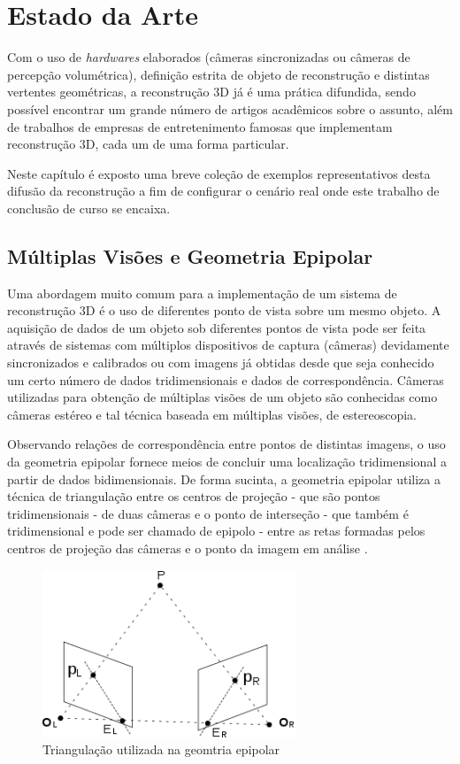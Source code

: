 \chapter{Estado da Arte}

Com o uso de \textit{hardwares} elaborados (câmeras sincronizadas ou câmeras de percepção volumétrica), definição estrita de objeto de reconstrução e distintas vertentes geométricas, a reconstrução 3D já é uma prática difundida, sendo possível encontrar um grande número de artigos acadêmicos sobre o assunto, além de trabalhos de empresas de entretenimento famosas que implementam reconstrução 3D, cada um de uma forma particular.

	Neste capítulo é exposto uma breve coleção de exemplos representativos desta difusão da reconstrução a fim de configurar o cenário real onde este trabalho de conclusão de curso se encaixa.
	
	\section{Múltiplas Visões e Geometria Epipolar}
	
	Uma abordagem muito comum para a implementação de um sistema de reconstrução 3D é o uso de diferentes ponto de vista sobre um mesmo objeto. A aquisição de dados de um objeto sob diferentes pontos de vista pode ser feita através de sistemas com múltiplos dispositivos de captura (câmeras) devidamente sincronizados e calibrados ou com imagens já obtidas desde que seja conhecido um certo número de dados tridimensionais e dados de correspondência. Câmeras utilizadas para obtenção de múltiplas visões de um objeto são conhecidas como câmeras estéreo e tal técnica baseada em múltiplas visões, de estereoscopia.
	
	Observando relações de correspondência entre pontos de distintas imagens, o uso da geometria epipolar fornece meios de concluir uma localização tridimensional a partir de dados bidimensionais. De forma sucinta, a geometria epipolar utiliza a técnica de triangulação entre os centros de projeção - que são pontos tridimensionais - de duas câmeras e o ponto de interseção - que também é tridimensional e pode ser chamado de epipolo - entre as retas formadas pelos centros de projeção das câmeras e o ponto da imagem em análise \cite[p.11]{animation}.
	
	\begin{figure}[!htb]
		\centering
		\includegraphics[height=5cm]{imagens/geometriaEpipolar.png}
		\caption{Triangulação utilizada na geomtria epipolar}
		\label{fotoGeometriaEpipolar}
	\end{figure}
	
